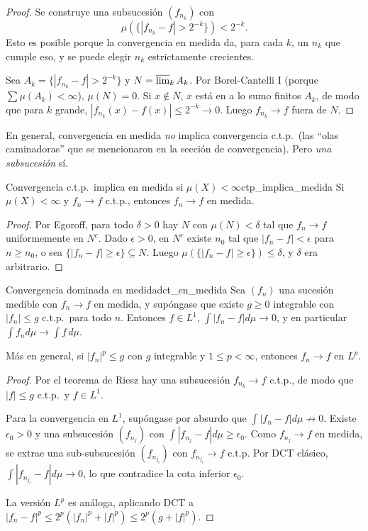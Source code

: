 \documentclass[11pt, a4paper]{article}
\begin{document}
\begin{proof}
Se construye una subsucesión $(f_{n_k})$ con
$$ \mu\!\left(\{|f_{n_k} - f| > 2^{-k}\}\right) < 2^{-k}. $$
Esto es posible porque la convergencia en medida da, para cada $k$, un $n_k$ que cumple eso, y
se puede elegir $n_k$ estrictamente crecientes.

Sea $A_k = \{|f_{n_k} - f| > 2^{-k}\}$ y $N = \varlimsup_k A_k$. Por Borel-Cantelli I (porque
$\sum \mu(A_k) < \infty$), $\mu(N) = 0$. Si $x \notin N$, $x$ está en a lo sumo finitos $A_k$,
de modo
que para $k$ grande, $|f_{n_k}(x) - f(x)| \le 2^{-k} \to 0$. Luego $f_{n_k} \to f$ fuera de $N$.
\end{proof}

\obs En general, convergencia en medida \emph{no} implica convergencia c.t.p.\ (las ``olas
caminadoras'' que se mencionaron en la sección de convergencia). Pero \emph{una subsucesión}
sí.

\begin{proposicion}{Convergencia c.t.p.\ implica en medida si $\mu(X) < \infty$}{ctp_implica_medida}
Si $\mu(X) < \infty$ y $f_n \to f$ c.t.p., entonces $f_n \to f$ en medida.
\end{proposicion}

\begin{proof}
Por Egoroff, para todo $\delta > 0$ hay $N$ con $\mu(N) < \delta$ tal que $f_n \to f$ uniformemente
en $N^c$. Dado $\epsilon > 0$, en $N^c$ existe $n_0$ tal que $|f_n - f| < \epsilon$ para
$n \ge n_0$,
o sea $\{|f_n - f| \ge \epsilon\} \subseteq N$. Luego $\mu(\{|f_n - f| \ge \epsilon\}) \le \delta$,
y $\delta$ era arbitrario.
\end{proof}

\begin{teorema}{Convergencia dominada en medida}{dct_en_medida}
Sea $(f_n)$ una sucesión medible con $f_n \to f$ en medida, y supóngase que existe $g \ge 0$
integrable con $|f_n| \le g$ c.t.p.\ para todo $n$. Entonces $f \in L^1$, $\int |f_n - f| d\mu
\to 0$, y en particular $\int f_n d\mu \to \int f \, d\mu$.

Más en general, si $|f_n|^p \le g$ con $g$ integrable y $1 \le p < \infty$, entonces
$f_n \to f$ en $L^p$.
\end{teorema}

\begin{proof}
Por el teorema de Riesz hay una subsucesión $f_{n_k} \to f$ c.t.p., de modo que $|f| \le g$ c.t.p.\
y $f \in L^1$.

Para la convergencia en $L^1$, supóngase por absurdo que $\int |f_n - f| d\mu \not\to 0$. Existe
$\epsilon_0 > 0$ y una subsucesión $(f_{n_j})$ con $\int |f_{n_j} - f| d\mu \ge \epsilon_0$. Como
$f_{n_j} \to f$ en medida, se extrae una sub-subsucesión $(f_{n_{j_l}})$ con $f_{n_{j_l}} \to f$
c.t.p. Por DCT clásico, $\int |f_{n_{j_l}} - f| d\mu \to 0$, lo que contradice la cota inferior
$\epsilon_0$.

La versión $L^p$ es análoga, aplicando DCT a $|f_n - f|^p \le 2^p (|f_n|^p + |f|^p) \le
2^p (g + |f|^p)$.
\end{proof}
\end{document}
